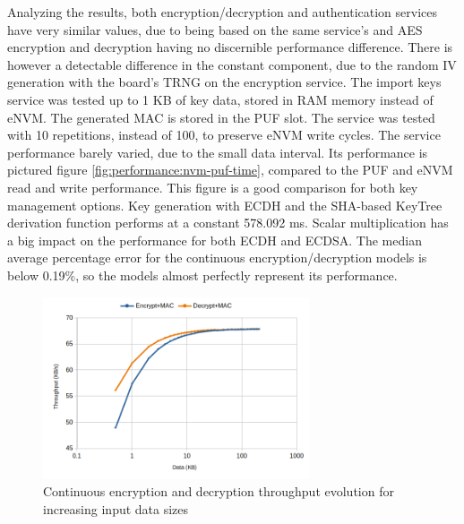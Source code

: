 Analyzing the results, both encryption/decryption and authentication services have very similar values, due to being based on the same service's and AES encryption and decryption having no discernible performance difference.
There is however a detectable difference in the constant component, due to the random IV generation with the board's TRNG on the encryption service.
The import keys service was tested up to 1 KB of key data, stored in RAM memory instead of eNVM. The generated MAC is stored in the PUF slot. The service was tested with 10 repetitions, instead of 100, to preserve eNVM write cycles.
The service performance barely varied, due to the small data interval. Its performance is pictured figure \ref{fig:performance:nvm-puf-time}, compared to the PUF and eNVM read and write performance. This figure is a good comparison for both key management options.
Key generation with ECDH and the SHA-based KeyTree derivation function performs at a constant 578.092 ms.
Scalar multiplication has a big impact on the performance for both ECDH and ECDSA.
The median average percentage error for the continuous encryption/decryption models is below 0.19\%, so the models almost perfectly represent its performance.%

\begin{figure}[h!]
	\centering
	\includegraphics[width=0.7\textwidth]{./Images/services-tput.png}
	\caption{Continuous encryption and decryption throughput evolution for increasing input data sizes}
	\label{fig:performance:services-tput}
\end{figure}

